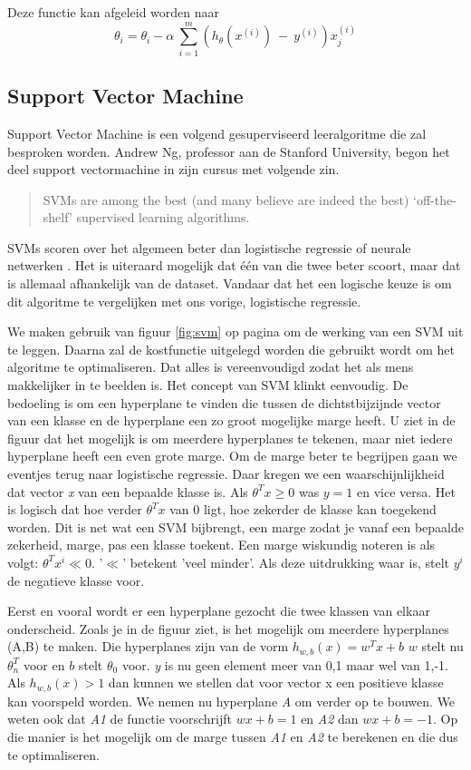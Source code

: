 Deze functie kan afgeleid worden naar 
$$
\theta_{i} = \theta_{i} - \alpha\:\sum_{i=1}^{m}(h_{\theta}(x^{(i)})\:-\:y^{(i)} ) x_{j}^{(i) }
$$


\subsection{Support Vector Machine}
\label{sec:Support-Vector-Machine}
Support Vector Machine is een volgend gesuperviseerd leeralgoritme die zal besproken worden. 
Andrew Ng, professor aan de Stanford University, begon het deel support vectormachine in zijn cursus \autocite{cursusAndrewNg} met volgende zin.
\begin{quote}
	SVMs are among the best (and many believe are indeed the best) ‘off-the-shelf’ supervised learning algorithms.
\end{quote}

SVMs scoren over het algemeen beter dan logistische regressie of neurale netwerken \autocite{vergelijkingSupervised}. Het is uiteraard mogelijk dat één van die twee beter scoort, maar dat is allemaal afhankelijk van de dataset. Vandaar dat het een logische keuze is om dit algoritme te vergelijken met ons vorige, logistische regressie. 

We maken gebruik van figuur \ref{fig:svm} op pagina \pageref{fig:svm} om de werking van een SVM uit te leggen. Daarna zal de kostfunctie uitgelegd worden die gebruikt wordt om het algoritme te optimaliseren. Dat alles is vereenvoudigd zodat het als mens makkelijker in te beelden is.
Het concept van SVM klinkt eenvoudig. De bedoeling is om een hyperplane te vinden die tussen de dichtstbijzijnde vector van een klasse en de hyperplane een zo groot mogelijke marge heeft. U ziet in de figuur dat het mogelijk is om meerdere hyperplanes te tekenen, maar niet iedere hyperplane heeft een even grote marge. Om de marge beter te begrijpen gaan we eventjes terug naar logistische regressie. Daar kregen we een waarschijnlijkheid dat vector \textit{x} van een bepaalde klasse is. Als $\theta^{T}x \geq 0$ was $y=1$ en vice versa. Het is logisch dat hoe verder $\theta^{T}x$ van 0 ligt, hoe zekerder de klasse kan toegekend worden. Dit is net wat een SVM bijbrengt, een marge zodat je vanaf een bepaalde zekerheid, marge, pas een klasse toekent. Een marge wiskundig noteren is als volgt: $\theta^{T}x^{i} \ll 0$. '$\ll$' betekent 'veel minder'. Als deze uitdrukking waar is, stelt $y^{i}$ de negatieve klasse voor.
 
Eerst en vooral wordt er een hyperplane gezocht die twee klassen van elkaar onderscheid. Zoals je in de figuur ziet, is het mogelijk om meerdere hyperplanes (A,B) te maken. Die hyperplanes zijn van de vorm $h_{w,b}(x) = w^{T}x + b$ $w$ stelt nu $\theta_{n}^{T}$ voor en $b$ stelt $\theta_{0}$ voor. \textit{y} is nu geen element meer van {0,1} maar wel van {1,-1}. Als $h_{w,b}(x) > 1$ dan kunnen we stellen dat voor vector x een positieve klasse kan voorspeld worden. 
We nemen nu hyperplane \textit{A} om verder op te bouwen. We weten ook dat \textit{A1} de functie voorschrijft $w x +b=1$ en \textit{A2} dan  $w x +b=-1$. Op die manier is het mogelijk om de marge tussen \textit{A1} en \textit{A2} te berekenen en die dus te optimaliseren.

